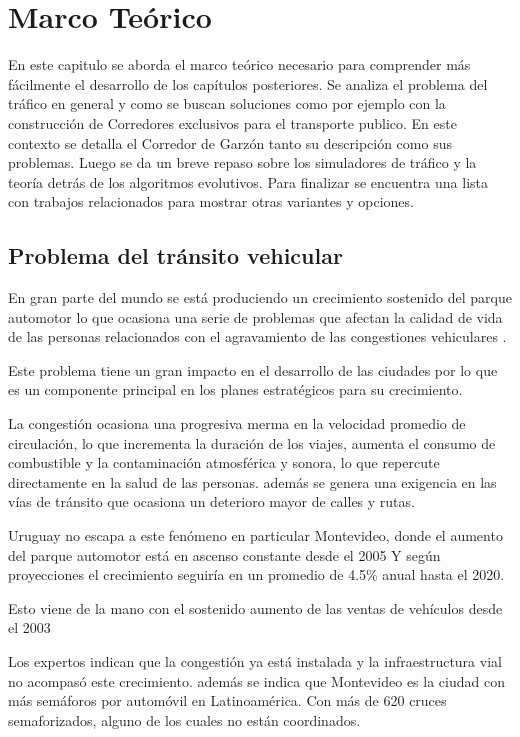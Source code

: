 \chapter{Marco Teórico}

 En este capitulo se aborda el marco teórico necesario para comprender más fácilmente el desarrollo de los capítulos posteriores. Se analiza el problema del tráfico en general y como se buscan soluciones como por ejemplo con la construcción de Corredores exclusivos para el transporte publico. En este contexto se detalla el Corredor de Garzón tanto su descripción como sus problemas. Luego se da un breve repaso sobre los simuladores de tráfico y la teoría detrás de los algoritmos evolutivos. Para finalizar se encuentra una lista con trabajos relacionados para mostrar otras variantes y opciones.

\section{Problema del tránsito vehicular}

En gran parte del mundo se está produciendo un crecimiento sostenido del parque automotor lo que ocasiona una serie de problemas que afectan la calidad de vida de las personas relacionados con el agravamiento de las congestiones vehiculares \citep{Cepal2003}.

Este problema tiene un gran impacto en el desarrollo de las ciudades por lo que es un componente principal en los planes estratégicos para su crecimiento.

La congestión ocasiona una progresiva merma en la velocidad promedio de circulación, lo que incrementa la duración de los viajes, aumenta el consumo de combustible y la contaminación atmosférica y sonora, lo que repercute directamente en la salud de las personas. 
además se genera una exigencia en las vías de tránsito que ocasiona un deterioro mayor de calles y rutas.

Uruguay no escapa a este fenómeno en particular Montevideo, donde el aumento del parque automotor está en ascenso constante desde el 2005 \citep{INE2014} 
Y según proyecciones el crecimiento seguiría en un promedio de 4.5\% anual hasta el 2020. \citep{BBVA2013}

Esto viene de la mano con el sostenido aumento de las ventas de vehículos  desde el 2003 \citep{Autoanuario2014}

Los expertos indican que la congestión ya está instalada y la infraestructura vial no acompasó este crecimiento. además se indica que Montevideo es la ciudad con más semáforos por automóvil en Latinoamérica. Con más de 620 cruces semaforizados, alguno de los cuales no están coordinados.\citep{Subrayado2013}

